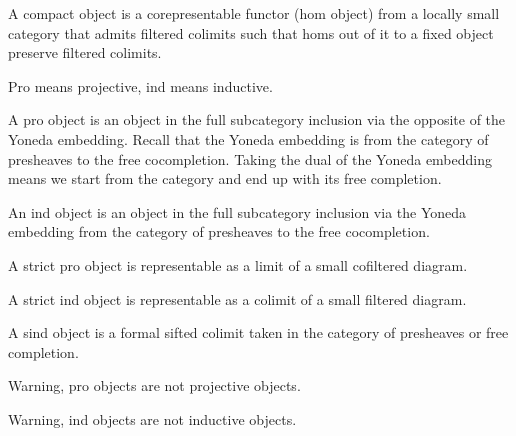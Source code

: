 \begin{definition}
    \label{definition-compact-object}
    A compact object is a corepresentable functor (hom object) from a locally small category that admits filtered colimits such that homs out of it to a fixed object preserve filtered colimits.
\end{definition}

Pro means projective, ind means inductive.

\begin{definition}
    \label{definition-pro-object}
    A pro object is an object in the full subcategory inclusion via the opposite of the Yoneda embedding. Recall that the Yoneda embedding is from the category of presheaves to the free cocompletion. Taking the dual of the Yoneda embedding means we start from the category and end up with its free completion.
\end{definition}

\begin{definition}
    \label{definition-ind-object}
    An ind object is an object in the full subcategory inclusion via the Yoneda embedding from the category of presheaves to the free cocompletion.
\end{definition}

\begin{definition}
    \label{definition-strict-pro-object}
    A strict pro object is representable as a limit of a small cofiltered diagram.
\end{definition}

\begin{definition}
    \label{definition-strict-ind-object}
    A strict ind object is representable as a colimit of a small filtered diagram.
\end{definition}

\begin{definition}
    \label{definition-sifted-ind-object}
    A sind object is a formal sifted colimit taken in the category of presheaves or free completion.
\end{definition}

\begin{remark}
    Warning, pro objects are not projective objects.

    Warning, ind objects are not inductive objects.
\end{remark}

